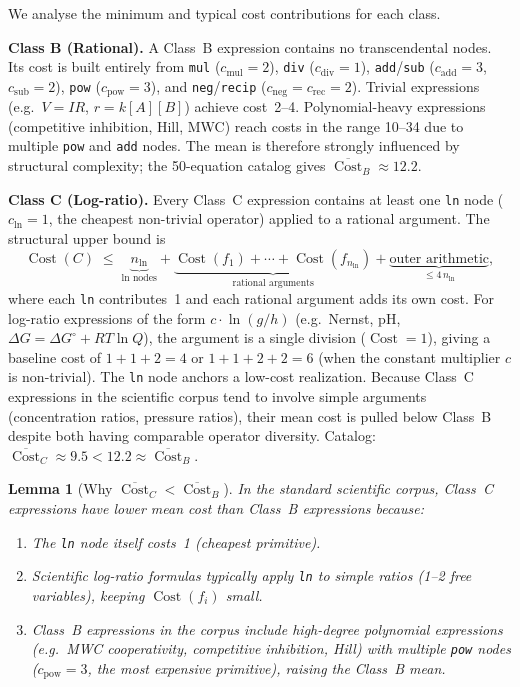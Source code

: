 \documentclass[12pt,a4paper]{article}
\newtheorem{lemma}[theorem]{Lemma}
\theoremstyle{definition}
\newcommand{\Cost}{\operatorname{Cost}}
\newcommand{\cln}{c_{\mathrm{ln}}}
\newcommand{\cmul}{c_{\mathrm{mul}}}
\newcommand{\cdiv}{c_{\mathrm{div}}}
\newcommand{\cadd}{c_{\mathrm{add}}}
\newcommand{\csub}{c_{\mathrm{sub}}}
\newcommand{\cpow}{c_{\mathrm{pow}}}
\newcommand{\cneg}{c_{\mathrm{neg}}}
\newcommand{\crec}{c_{\mathrm{rec}}}
\begin{document}
We analyse the minimum and typical cost contributions for each class.

\medskip
\noindent\textbf{Class B (Rational).}
A Class~B expression contains no transcendental nodes.
Its cost is built entirely from
\texttt{mul} ($\cmul=2$),
\texttt{div} ($\cdiv=1$),
\texttt{add}/\texttt{sub} ($\cadd=3$, $\csub=2$),
\texttt{pow} ($\cpow=3$),
and \texttt{neg}/\texttt{recip} ($\cneg=\crec=2$).
Trivial expressions (e.g.\ $V = IR$, $r = k[A][B]$) achieve cost~2--4.
Polynomial-heavy expressions (competitive inhibition, Hill, MWC) reach
costs in the range 10--34 due to multiple \texttt{pow} and \texttt{add}
nodes.
The mean is therefore strongly influenced by structural complexity; the
50-equation catalog gives $\overline{\Cost}_B \approx 12.2$.

\medskip
\noindent\textbf{Class C (Log-ratio).}
Every Class~C expression contains at least one \texttt{ln} node
($\cln = 1$, the cheapest non-trivial operator) applied to a rational
argument.
The structural upper bound is
\[
  \Cost(C) \;\leq\;
    \underbrace{n_{\ln}}_{\text{ln nodes}}
  + \underbrace{\Cost(f_1) + \cdots + \Cost(f_{n_{\ln}})}_{\text{rational arguments}}
  + \underbrace{\text{outer arithmetic}}_{\leq 4\,n_{\ln}},
\]
where each \texttt{ln} contributes~1 and each rational argument adds its
own cost.
For log-ratio expressions of the form $c \cdot \ln(g/h)$ (e.g.\ Nernst,
pH, $\Delta G = \Delta G^\circ + RT\ln Q$), the argument is a single
division ($\Cost = 1$), giving a baseline cost of $1 + 1 + 2 = 4$ or
$1 + 1 + 2 + 2 = 6$ (when the constant multiplier $c$ is non-trivial).
The \texttt{ln} node anchors a low-cost realization.
Because Class~C expressions in the scientific corpus tend to involve
simple arguments (concentration ratios, pressure ratios), their mean
cost is pulled below Class~B despite both having comparable operator
diversity.
Catalog: $\overline{\Cost}_C \approx 9.5 < 12.2 \approx \overline{\Cost}_B$.

\begin{lemma}[Why $\overline{\Cost}_C < \overline{\Cost}_B$]
\label{lem:CltB}
In the standard scientific corpus, Class~C expressions have lower mean
cost than Class~B expressions because:
\begin{enumerate}
  \item The \texttt{ln} node itself costs~1 (cheapest primitive).
  \item Scientific log-ratio formulas typically apply \texttt{ln} to
        simple ratios (1--2 free variables), keeping $\Cost(f_i)$ small.
  \item Class~B expressions in the corpus include high-degree polynomial
        expressions (e.g.\ MWC cooperativity, competitive inhibition,
        Hill) with multiple \texttt{pow} nodes ($\cpow = 3$, the most
        expensive primitive), raising the Class~B mean.
\end{enumerate}
\end{lemma}
\end{document}
